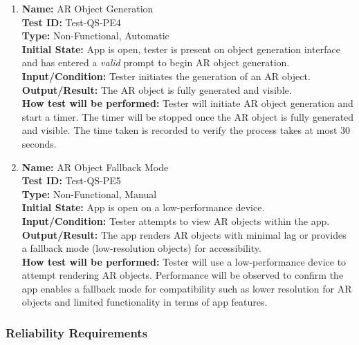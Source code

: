 \documentclass[12pt, titlepage]{article}
\begin{document}
\begin{enumerate}
  \item \textbf{Name:} AR Object Generation \label{itm:Test-QS-PE4} \\
        \textbf{Test ID:} Test-QS-PE4 \\
        \textbf{Type:} Non-Functional, Automatic \\
        \textbf{Initial State:} App is open, tester is present on object generation interface and has entered a \textit{valid} prompt to begin AR object generation. \\
        \textbf{Input/Condition:} Tester initiates the generation of an AR object. \\
        \textbf{Output/Result:} The AR object is fully generated and visible. \\
        \textbf{How test will be performed:} Tester will initiate AR object generation and start a timer. The timer will be stopped once the AR object is fully generated and visible. The time taken is recorded to verify the process takes at most 30 seconds. \\

  \item \textbf{Name:} AR Object Fallback Mode \label{itm:Test-QS-PE5} \\
        \textbf{Test ID:} Test-QS-PE5 \\
        \textbf{Type:} Non-Functional, Manual \\
        \textbf{Initial State:} App is open on a low-performance device. \\
        \textbf{Input/Condition:} Tester attempts to view AR objects within the app. \\
        \textbf{Output/Result:} The app renders AR objects with minimal lag or provides a fallback mode (low-resolution objects) for accessibility. \\
        \textbf{How test will be performed:} Tester will use a low-performance device to attempt rendering AR objects. Performance will be observed to confirm the app enables a fallback mode for compatibility such as lower resolution for AR objects and limited functionality in terms of app features. \\

\end{enumerate}

\subsubsection{Reliability Requirements}
\end{document}
